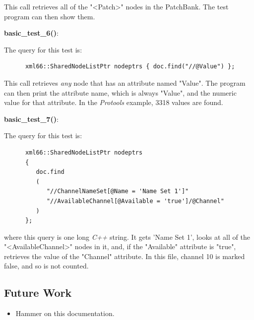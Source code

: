    This call retrieves all of the "<Patch>" nodes in the PatchBank.
   The test program can then show them.

   \textbf{basic\_test\_6()}:

   The query for this test is:

   \begin{verbatim}
      xml66::SharedNodeListPtr nodeptrs { doc.find("//@Value") };
   \end{verbatim}

   This call retrieves \textsl{any} node that has an attribute
   named "Value".
   The program can then print the attribute name, which is always
   "Value", and the numeric value for that attribute.
   In the \textsl{Protools} example, 3318 values are found.

   \textbf{basic\_test\_7()}:

   The query for this test is:

   \begin{verbatim}
      xml66::SharedNodeListPtr nodeptrs
      {
         doc.find
         (
            "//ChannelNameSet[@Name = 'Name Set 1']"
            "//AvailableChannel[@Available = 'true']/@Channel"
         )
      };
   \end{verbatim}

   where this query is one long \textsl{C++} string.
   It gets 'Name Set 1', looks at all of the "<AvailableChannel>" nodes
   in it, and, if the "Available" attribute is "true", retrieves
   the value of the "Channel" attribute. In this file, channel 10
   is marked false, and so is not counted.

\subsection{Future Work}
\label{subsec:xpath_future_work}

   \begin{itemize}
      \item Hammer on this documentation.
   \end{itemize}

